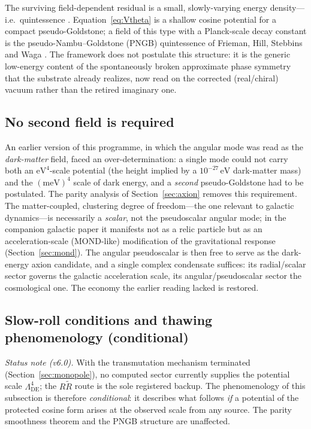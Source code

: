 \documentclass[11pt]{article}
\newcommand{\LDE}{\Lambda_{\mathrm{DE}}}
\begin{document}
The surviving field-dependent residual is a small, slowly-varying
energy density---i.e.\ quintessence \cite{Ratra:1987rm,Caldwell:2005tm}.
Equation~\eqref{eq:Vtheta} is a shallow cosine potential for a compact
pseudo-Goldstone; a field of this type with a Planck-scale decay
constant is the pseudo-Nambu--Goldstone (PNGB) quintessence of Frieman,
Hill, Stebbins and Waga \cite{Frieman:1995pm}.  The framework does not
postulate this structure: it is the generic low-energy content of the
spontaneously broken approximate phase symmetry that the substrate
already realizes, now read on the corrected (real/chiral) vacuum rather
than the retired imaginary one.

\subsection{No second field is required}

An earlier version of this programme, in which the angular mode was
read as the \emph{dark-matter} field, faced an over-determination: a
single mode could not carry both an $\mathrm{eV}^4$-scale potential
(the height implied by a $10^{-27}\,\mathrm{eV}$ dark-matter mass) and
the $(\mathrm{meV})^4$ scale of dark energy, and a \emph{second}
pseudo-Goldstone had to be postulated.  The parity analysis of
Section~\ref{sec:axion} removes this requirement.  The matter-coupled,
clustering degree of freedom---the one relevant to galactic
dynamics---is necessarily a \emph{scalar}, not the pseudoscalar
angular mode; in the companion galactic paper it manifests not as a
relic particle but as an acceleration-scale (MOND-like) modification
of the gravitational response (Section~\ref{sec:mond}).  The angular
pseudoscalar is then free to serve as the dark-energy axion
candidate, and a single
complex condensate suffices: its radial/scalar sector governs the
galactic acceleration scale, its angular/pseudoscalar sector the
cosmological one.  The economy the earlier reading lacked is restored.

\subsection{Slow-roll conditions and thawing phenomenology
(conditional)}

\emph{Status note (v6.0).}  With the transmutation mechanism
terminated (Section~\ref{sec:monopole}), no computed sector currently
supplies the potential scale $\LDE^4$; the $R\tilde R$ route is the
sole registered backup.  The phenomenology of this subsection is
therefore \emph{conditional}: it describes what follows \emph{if} a
potential of the protected cosine form arises at the observed scale
from any source.  The parity smoothness theorem and the PNGB
structure are unaffected.
\end{document}

